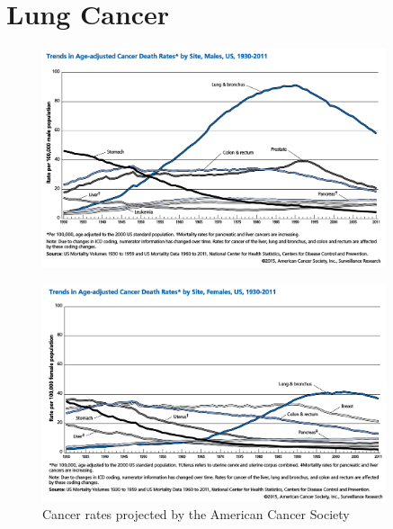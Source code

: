 \newpage
\section*{Lung Cancer}

\begin{figure}
  \vspace*{\fill}
  \centering
  \includegraphics[width=0.9\textwidth]{./figures/supplementary/acsMenLungCancer.png}
  \label{fig:acsMen}\par\vfill
  \includegraphics[width=0.9\textwidth]{./figures/supplementary/acsWomenLungCancer.png}
  \caption{Cancer rates projected by the American Cancer Society}
  \label{fig:acsWomen}
\end{figure}

